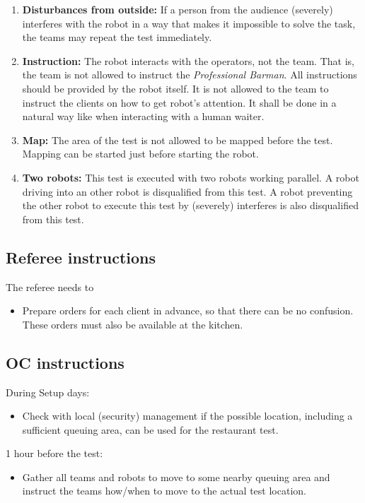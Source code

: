 \begin{enumerate}[nosep]
	\item \textbf{Disturbances from outside:} If a person from the audience (severely) interferes with the robot in a way that makes it impossible to solve the task, the teams may repeat the test immediately.

	\item \textbf{Instruction:} The robot interacts with the operators, not the team. That is, the team is not allowed to instruct the \textit{Professional Barman}. All instructions should be provided by the robot itself.
	It is not allowed to the team to instruct the clients on how to get robot's attention. It shall be done in a natural way like when interacting with a human waiter.

    \item \textbf{Map:} The area of the test is not allowed to be mapped before the test. Mapping can be started just before starting the robot.

    \item \textbf{Two robots:} This test is executed with two robots working parallel. A robot driving into an other robot is disqualified from this test. A robot preventing the other robot to execute this test by (severely) interferes is also disqualified from this test.

\end{enumerate}

\subsection{Referee instructions}

The referee needs to
\begin{itemize}
	\item Prepare orders for each client in advance, so that there can be no confusion. These orders must also be available at the kitchen.
\end{itemize}

\subsection{OC instructions}
During Setup days:
\begin{itemize}[nosep]
	\item Check with local (security) management if the possible location, including a sufficient queuing area, can be used for the restaurant test.
\end{itemize}

1 hour before the test:
\begin{itemize}[nosep]
	\item Gather all teams and robots to move to some nearby queuing area and instruct the teams how/when to move to the actual test location.
\end{itemize}

% 


